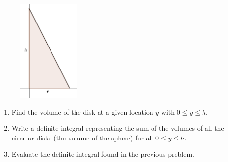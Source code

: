\documentclass[12pt,letterpaper,fleqn]{article}
\begin{document}
\begin{enumerate}
       \begin{figure}[!htb]
        \centering
        \includegraphics[height=2in]{img/triangular_region.png}
       \end{figure}
       \begin{enumerate}
        \item Find the volume of the disk at a given location $y$ with $0 \leq y \leq h$.
        \item Write a definite integral representing the sum of the volumes of all the circular disks (the volume of the sphere) for all $0 \leq y \leq h$.
        \item Evaluate the definite integral found in the previous problem.
       \end{enumerate}
\end{enumerate}
\end{document}
